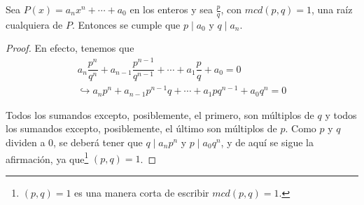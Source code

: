 \begin{section-theorem.tcb}
    Sea $P(x) = a_n x^n + \cdots + a_0$ en los enteros y sea $\frac{p}{q}$, con $mcd(p, q) = 1$, una raíz cualquiera de $P$.
    Entonces se cumple que $p \mid a_0$ y $q \mid a_n$.
\end{section-theorem.tcb}
\begin{proof}
    En efecto, tenemos que
    \begin{gather*}
        a_n \dfrac{p^n}{q^n} + a_{n - 1} \dfrac{p^{n - 1}}{q^{n - 1}} + \cdots + a_1 \dfrac{p}{q} + a_0  = 0 \\
        \hookrightarrow a_n p^n + a_{n - 1}p^{n - 1}q + \cdots + a_1 p q^{n - 1} + a_0 q^n = 0
    \end{gather*}

    Todos los sumandos excepto, posiblemente, el primero, son múltiplos de $q$ y todos los sumandos excepto, posiblemente, el último son múltiplos de $p$.
    Como $p$ y $q$ dividen a 0, se deberá tener que $q \mid a_n p^n$ y $p \mid a_0 q^n$, y de aquí se sigue la afirmación, ya que\footnote{$(p, q) =  1$ es una manera corta de escribir $mcd(p, q) = 1$.} $(p, q) = 1$.
\end{proof}


